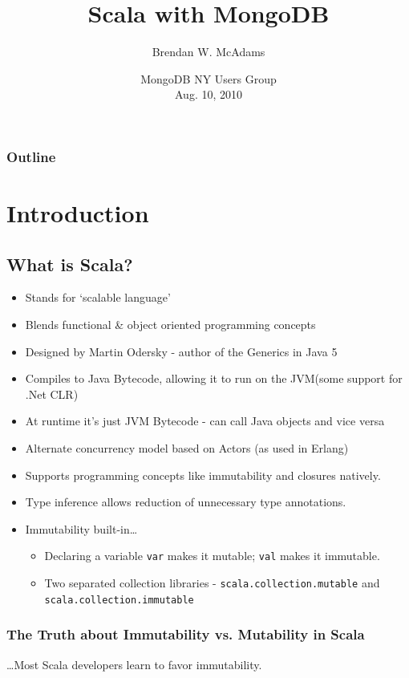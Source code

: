 \documentclass{beamer}
\title[Integrating Scala + MongoDB]{Scala with MongoDB} %
\author[B.W. McAdams]{Brendan W. McAdams}
\institute[Novus Partners]{Novus Partners, Inc.}
\date[MongoDB NY Users Group - 8/10/10]
     {MongoDB NY Users Group\\ Aug. 10, 2010}
\newenvironment{itemizeframe}
               {\begin{frame}\startitemizeframe} 
               {\stopitemizeframe\end{frame}}
\newcommand\startitemizeframe{\begin{itemize}} \newcommand\stopitemizeframe{\end{itemize}}
\begin{document}
\begin{frame}
  \titlepage
\end{frame}

\begin{frame}
\frametitle{Outline}
  \tableofcontents
\end{frame}

\section{Introduction}

\subsection{What is Scala?}
\begin{itemizeframe}
    \frametitle{What Is Scala?}
    \item Stands for `scalable language'
    \item Blends functional \& object oriented programming concepts
    \item Designed by Martin Odersky - author of the Generics in Java 5
    \item Compiles to Java Bytecode, allowing it to run on the JVM(some support for .Net CLR)
    \item At runtime it's just JVM Bytecode - can call Java objects and vice versa    
    \item Alternate concurrency model based on Actors (as used in Erlang)
    \item Supports programming concepts like immutability and closures natively.
    \item Type inference allows reduction of unnecessary type annotations.
    \item Immutability built-in\ldots
        \begin{itemize}
            \item Declaring a variable \texttt{var} makes it mutable;  \texttt{val} makes it immutable.
            \item Two separated collection libraries - \texttt{scala.collection.mutable} and \texttt{scala.collection.immutable}
       
        \end{itemize}
\end{itemizeframe}
\begin{frame}
    \frametitle{The Truth about Immutability vs. Mutability in Scala}
     {\huge \ldots Most Scala developers learn to favor immutability.}
\end{frame}
\end{document}
